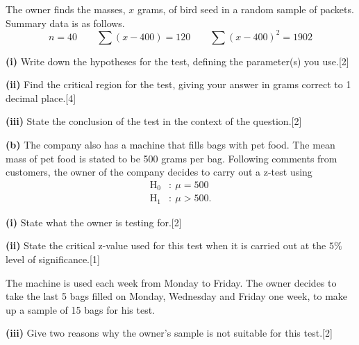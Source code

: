 \documentclass[a4paper,11pt,oneside]{article}
\newcommand{\partlabel}[1]{\par\needspace{3\baselineskip}\smallskip\noindent\textbf{#1}\quad}
\newcommand{\mk}[1]{\hfill[#1]}
\begin{document}
The owner finds the masses, $x$ grams, of bird seed in a random sample of packets. Summary data is as follows.
\[ n=40 \qquad \sum(x-400)=120 \qquad \sum(x-400)^2=1902 \]
\partlabel{(i)}
Write down the hypotheses for the test, defining the parameter(s) you use.\mk{2}
\partlabel{(ii)}
Find the critical region for the test, giving your answer in grams correct to 1 decimal place.\mk{4}
\partlabel{(iii)}
State the conclusion of the test in the context of the question.\mk{2}
\partlabel{(b)}
The company also has a machine that fills bags with pet food. The mean mass of pet food is stated to be 500 grams per bag. Following comments from customers, the owner of the company decides to carry out a z-test using
\begin{align*}
\mathrm{H}_0&:\ \mu=500\\
\mathrm{H}_1&:\ \mu>500.
\end{align*}
\partlabel{(i)}
State what the owner is testing for.\mk{2}
\partlabel{(ii)}
State the critical z-value used for this test when it is carried out at the $5\%$ level of significance.\mk{1}

The machine is used each week from Monday to Friday. The owner decides to take the last 5 bags filled on Monday, Wednesday and Friday one week, to make up a sample of 15 bags for his test.
\partlabel{(iii)}
Give two reasons why the owner's sample is not suitable for this test.\mk{2}
\end{document}
